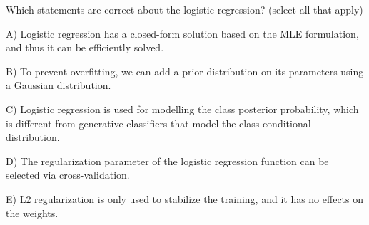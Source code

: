 Which statements are correct about the logistic regression? (select all that apply)


A) Logistic regression has a closed-form solution based on the MLE formulation, and thus it can be efficiently solved.


B) To prevent overfitting, we can add a prior distribution on its parameters using a Gaussian distribution.


C) Logistic regression is used for modelling the class posterior probability, which is different from generative classifiers that model the class-conditional distribution.


D) The regularization parameter of the logistic regression function can be selected via cross-validation.


E) L2 regularization is only used to stabilize the training, and it has no effects on the weights.
